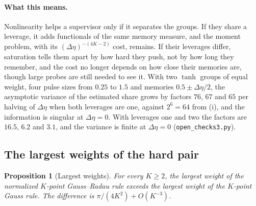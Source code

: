 \documentclass[12pt]{article}
\newtheorem{proposition}[theorem]{Proposition}
\theoremstyle{definition}
\theoremstyle{remark}
\begin{document}
\paragraph{What this means.} Nonlinearity helps a supervisor only if it separates the groups. If they share a leverage, it adds functionals of the same memory measure, and the moment problem, with its $(\Delta\eta)^{-(4K-2)}$ cost, remains. If their leverages differ, saturation tells them apart by how hard they push, not by how long they remember, and the cost no longer depends on how close their memories are, though large probes are still needed to see it. With two $\tanh$ groups of equal weight, four pulse sizes from $0.25$ to $1.5$ and memories $0.5\pm\Delta\eta/2$, the asymptotic variance of the estimated share grows by factors $76$, $67$ and $65$ per halving of $\Delta\eta$ when both leverages are one, against $2^6=64$ from (i), and the information is singular at $\Delta\eta=0$. With leverages one and two the factors are $16.5$, $6.2$ and $3.1$, and the variance is finite at $\Delta\eta=0$ (\nolinkurl{open_checks3.py}).

\subsection{The largest weights of the hard pair}

\begin{proposition}[Largest weights]\label{prop:maxweight}
For every $K\ge2$, the largest weight of the normalized $K$-point Gauss--Radau rule exceeds the largest weight of the $K$-point Gauss rule. The difference is $\pi/(4K^2)+O(K^{-3})$.
\end{proposition}
\end{document}
